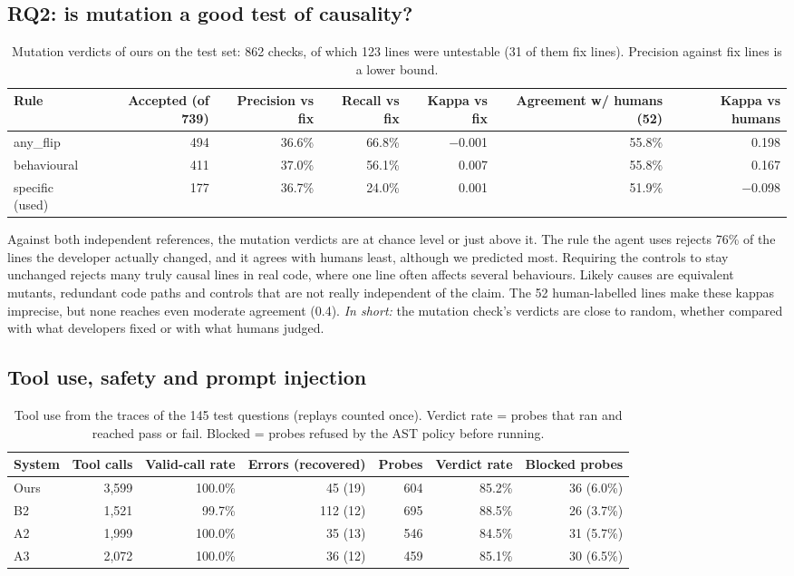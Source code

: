 \documentclass[10pt,a4paper]{article}
\newcommand{\m}{$-$}
\begin{document}
\subsection{RQ2: is mutation a good test of causality?}

\begin{table}[!htb]
\centering\small
\caption{Mutation verdicts of ours on the test set: 862 checks, of which 123 lines were untestable (31 of them fix
lines). Precision against fix lines is a lower bound.}
\setlength{\tabcolsep}{3.6pt}
\begin{tabular}{lrrrrrr}
\toprule
Rule & Accepted (of 739) & Precision vs fix & Recall vs fix & Kappa vs fix & Agreement w/ humans (52) & Kappa vs humans\\
\midrule
any\_flip & 494 & 36.6\% & 66.8\% & \m0.001 & 55.8\% & 0.198\\
behavioural & 411 & 37.0\% & 56.1\% & 0.007 & 55.8\% & 0.167\\
specific (used) & 177 & 36.7\% & 24.0\% & 0.001 & 51.9\% & \m0.098\\
\bottomrule
\end{tabular}
\end{table}

Against both independent references, the mutation verdicts are at chance level or just above it. The rule the agent
uses rejects 76\% of the lines the developer actually changed, and it agrees with humans least, although we predicted
most. Requiring the controls to stay unchanged rejects many truly causal lines in real code, where one line often
affects several behaviours. Likely causes are equivalent mutants, redundant code paths and controls that are not
really independent of the claim. The 52 human-labelled lines make these kappas imprecise, but none reaches even
moderate agreement (0.4).
\emph{In short:} the mutation check's verdicts are close to random, whether compared with what developers fixed or
with what humans judged.

\subsection{Tool use, safety and prompt injection}

\begin{table}[!htb]
\centering\small
\caption{Tool use from the traces of the 145 test questions (replays counted once). Verdict rate = probes that ran and
reached pass or fail. Blocked = probes refused by the AST policy before running.}
\begin{tabular}{lrrrrrr}
\toprule
System & Tool calls & Valid-call rate & Errors (recovered) & Probes & Verdict rate & Blocked probes\\
\midrule
Ours & 3,599 & 100.0\% & 45 (19) & 604 & 85.2\% & 36 (6.0\%)\\
B2 & 1,521 & 99.7\% & 112 (12) & 695 & 88.5\% & 26 (3.7\%)\\
A2 & 1,999 & 100.0\% & 35 (13) & 546 & 84.5\% & 31 (5.7\%)\\
A3 & 2,072 & 100.0\% & 36 (12) & 459 & 85.1\% & 30 (6.5\%)\\
\bottomrule
\end{tabular}
\end{table}
\end{document}
